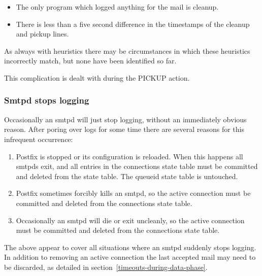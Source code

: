 \documentclass[a4paper,12pt,draft]{article}
\begin{document}
\begin{itemize}

    \item The only program which logged anything for the mail is cleanup.

    \item There is less than a five second difference in the timestamps of
        the cleanup and pickup lines.

\end{itemize}

As always with heuristics there may be circumstances in which these
heuristics incorrectly match, but none have been identified so far.

This complication is dealt with during the PICKUP action.

\subsubsection{Smtpd stops logging}

\label{smtpd stops logging}

Occasionally an smtpd will just stop logging, without an immediately
obvious reason.  After poring over logs for some time there are several
reasons for this infrequent occurrence:

\begin{enumerate}

    \item Postfix is stopped or its configuration is reloaded.  When this
        happens all smtpds exit, and all entries in the connections state
        table must be committed and deleted from the state table.  The
        queueid state table is untouched.

    \item Postfix sometimes forcibly kills an smtpd, so the active
        connection must be committed and deleted from the connections state
        table.

    \item Occasionally an smtpd will die or exit uncleanly, so the active
        connection must be committed and deleted from the connections state
        table.

\end{enumerate}

The above appear to cover all situations where an smtpd suddenly stops
logging.  In addition to removing an active connection the last accepted
mail may need to be discarded, as detailed in
section~\ref{timeouts-during-data-phase}.
\end{document}
